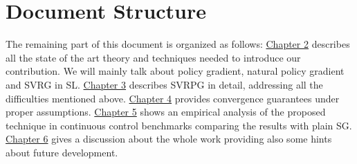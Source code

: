 \section{Document Structure}
The remaining part of this document is organized as follows:\newline
\newline
\hyperref[chap:art]{Chapter 2} describes all the state of the art theory and techniques needed to introduce our contribution. We will mainly talk about policy gradient, natural policy gradient and \acs{SVRG} in \acs{SL}.\newline
\hyperref[chap:algorithm]{Chapter 3} describes \acs{SVRPG} in detail, addressing all the difficulties mentioned above.\newline
\hyperref[chap:convergence]{Chapter 4} provides convergence guarantees under proper assumptions.\newline
\hyperref[chap:experiments]{Chapter 5} shows an empirical analysis of the proposed technique in continuous control benchmarks comparing the results with plain \acs{SG}.\newline
\hyperref[chap:conclusions]{Chapter 6} gives a discussion about the whole work providing also some hints about future development.
